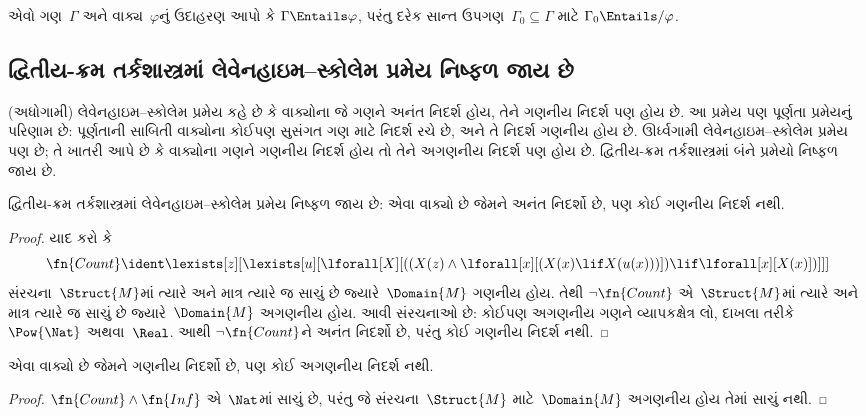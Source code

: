 \begin{prob}
એવો ગણ~$\Gamma$ અને વાક્ય~$\varphi$નું ઉદાહરણ આપો કે
$\Gamma \Entails \varphi$, પરંતુ દરેક સાન્ત ઉપગણ~$\Gamma_0 \subseteq
\Gamma$ માટે $\Gamma_0 \Entails/ \varphi$.
\end{prob}






\subsection{દ્વિતીય-ક્રમ તર્કશાસ્ત્રમાં લેવેનહાઇમ--સ્કોલેમ પ્રમેય નિષ્ફળ જાય છે}\label{sol:met:lst:sec}

\begin{explain}
(અધોગામી) લેવેનહાઇમ--સ્કોલેમ પ્રમેય કહે છે કે વાક્યોના જે
ગણને અનંત નિદર્શ હોય, તેને ગણનીય નિદર્શ પણ હોય છે. આ
પ્રમેય પણ પૂર્ણતા પ્રમેયનું પરિણામ છે: પૂર્ણતાની સાબિતી
વાક્યોના કોઈપણ સુસંગત ગણ માટે નિદર્શ રચે છે, અને તે નિદર્શ
ગણનીય હોય છે. ઊર્ધ્વગામી લેવેનહાઇમ--સ્કોલેમ પ્રમેય પણ છે;
તે ખાતરી આપે છે કે વાક્યોના ગણને ગણનીય નિદર્શ
હોય તો તેને અગણનીય નિદર્શ પણ હોય છે. દ્વિતીય-ક્રમ
તર્કશાસ્ત્રમાં બંને પ્રમેયો નિષ્ફળ જાય છે.
\end{explain}


\begin{thm}
 દ્વિતીય-ક્રમ તર્કશાસ્ત્રમાં લેવેનહાઇમ--સ્કોલેમ
પ્રમેય નિષ્ફળ જાય છે: એવા વાક્યો છે જેમને અનંત નિદર્શો છે,
પણ કોઈ ગણનીય નિદર્શ નથી.
\end{thm}

\begin{proof}
યાદ કરો કે
\[
\fn{Count} \ident \lexists[z][\lexists[u][\lforall[X][((X(z) \land
      \lforall[x][(X(x) \lif X(u(x)))]) \lif \lforall[x][X(x)])]]]
\]
સંરચના~$\Struct{M}$માં ત્યારે અને માત્ર ત્યારે જ સાચું છે
જ્યારે~$\Domain{M}$ ગણનીય હોય. તેથી
$\lnot\fn{Count}$ એ~$\Struct{M}$માં ત્યારે અને માત્ર ત્યારે જ
સાચું છે જ્યારે~$\Domain{M}$ અગણનીય હોય. આવી
સંરચનાઓ છે: કોઈપણ અગણનીય ગણને વ્યાપકક્ષેત્ર લો,
દાખલા તરીકે $\Pow{\Nat}$ અથવા~$\Real$. આથી
$\lnot \fn{Count}$ને અનંત નિદર્શો છે, પરંતુ કોઈ
ગણનીય નિદર્શ નથી.
\end{proof}

\begin{thm}
એવા વાક્યો છે જેમને ગણનીય નિદર્શો છે,
પણ કોઈ અગણનીય નિદર્શ નથી.
\end{thm}

\begin{proof}
$\fn{Count} \land \fn{Inf}$ એ~$\Nat$માં સાચું છે, પરંતુ
જે સંરચના~$\Struct{M}$ માટે~$\Domain{M}$
અગણનીય હોય તેમાં સાચું નથી.
\end{proof}






